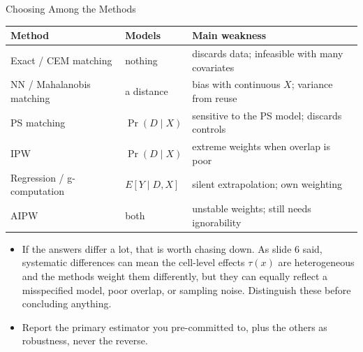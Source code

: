 \documentclass[aspectratio=169,11pt,xcolor=dvipsnames]{beamer}
\newcommand{\E}{E}
\begin{document}
\begin{frame}[allowframebreaks,t]{Choosing Among the Methods}
\begin{center}\footnotesize
\renewcommand{\arraystretch}{1.2}
\begin{tabular}{lll}
\toprule
Method & Models & Main weakness \\
\midrule
Exact / CEM matching & nothing & discards data; infeasible with many covariates \\
NN / Mahalanobis matching & a distance & bias with continuous $X$; variance from reuse \\
PS matching & $\Pr(D\mid X)$ & sensitive to the PS model; discards controls \\
IPW & $\Pr(D\mid X)$ & extreme weights when overlap is poor \\
Regression / g-computation & $\E[Y\mid D,X]$ & silent extrapolation; own weighting \\
AIPW & both & unstable weights; still needs ignorability \\
\bottomrule
\end{tabular}
\end{center}
\vskip4pt
\begin{itemize}\itemsep2pt
  \item \alert{If the answers differ a lot, that is worth chasing down.} As
        slide 6 said, systematic differences can mean the cell-level effects
        $\tau(x)$ are heterogeneous and the methods weight them differently, 
        but they can equally reflect a misspecified model, poor overlap, or
        sampling noise. Distinguish these before concluding anything.
  \item Report the primary estimator you pre-committed to, plus the others as
        robustness, never the reverse.
\end{itemize}
\end{frame}
\end{document}
